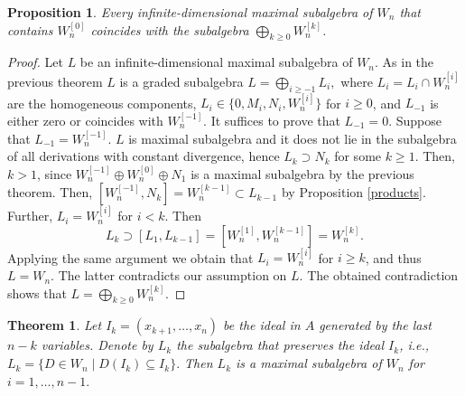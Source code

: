 \documentclass[12pt,a4paper]{amsart}
\theoremstyle{plain}
\newtheorem{theorem}{Theorem}
\newtheorem{proposition}{Proposition}
\theoremstyle{definition}
\begin{document}
{	\begin{proposition}
		Every infinite-dimensional maximal subalgebra of $W_n$ that contains $W_n^{[0]}$ coincides with the subalgebra
		$\bigoplus_{k \ge 0} W_n^{[k]}$.
	\end{proposition}
	\begin{proof}
		Let $L$ be an infinite-dimensional maximal subalgebra of $W_n$. 
		As in the previous theorem $L$ is a graded subalgebra
		$	L = \bigoplus_{i \ge -1} L_i,	$
		where $L_i=L_i\cap W_n^{[i]}$ are the homogeneous components,
		$L_i \in \{0, M_i, N_i, W_n^{[i]}\}$ for $i \ge 0$, and
		$L_{-1}$ is either zero or coincides with $W_n^{[-1]}$.
		It suffices to prove that $L_{-1} = 0$.
		Suppose that $L_{-1} = W_n^{[-1]}$.
		$L$ is maximal subalgebra and it does not lie in the subalgebra of all derivations with constant divergence,
		hence $L_k \supset N_k$ for some $k \ge 1$. Then, $k > 1$, since $W_n^{[-1]} \oplus W_n^{[0]} \oplus N_1$
		is a maximal subalgebra by the previous theorem.
		Then, $[W_n^{[-1]}, N_{k}] = W_{n}^{[k-1]} \subset L_{k-1}$ by Proposition  \ref{products}.
		Further, $L_i = W_n^{[i]}$ for $i < k$.
		Then 
		$$L_k \supset [L_1, L_{k-1}] = [W_n^{[1]}, W_n^{[k-1]}] = W_n^{[k]}.$$
		Applying the same argument we obtain that $L_i = W_n^{[i]}$ for $i \ge k$, and thus $L = W_n$. The latter contradicts our assumption on $L.$  The obtained contradiction shows that $L=\bigoplus_{k \ge 0} W_n^{[k]}.$
		
	\end{proof}
	
	\begin{theorem}
		Let $I_k = (x_{k+1}, \dots, x_n)$ be the ideal in $A$ generated by the last $n-k$ variables. Denote by $L_k$ the subalgebra that preserves the ideal $I_k$, i.e., 
		$L_k = \{ D \in W_n \mid D(I_k) \subseteq I_k \}.$
		Then $L_k$ is a maximal subalgebra of $W_n$ for $i=1, \ldots , n-1.$ 
		
	\end{theorem}
	
}
\end{document}
